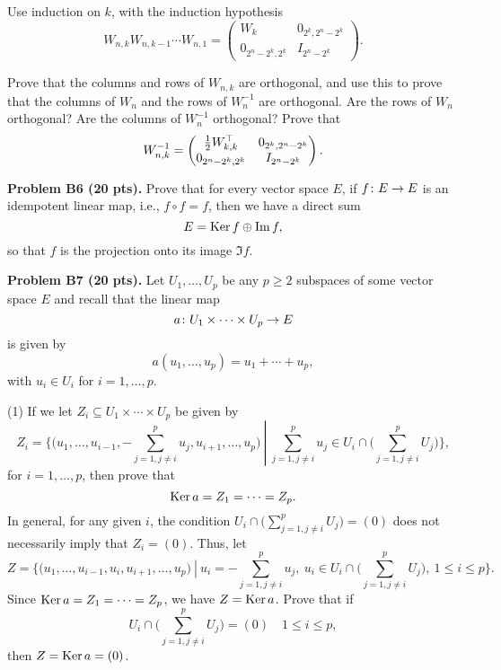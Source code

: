 \documentclass[12pt]{article}
\begin{document}
\medskip
\hint
Use induction on $k$,  with the induction hypothesis
\[
W_{n, k} W_{n, k - 1}\cdots W_{n, 1} = 
\begin{pmatrix}
 W_{k} & 0_{2^{k}, 2^{n} - 2^{k}} \\
0_{2^{n}- 2^{k}, 2^k} &  I_{2^{n} - 2^{k}}
\end{pmatrix}.
\]


\medskip
Prove that the columns and rows of $W_{n, k}$ are orthogonal, and use
this to prove that the columns of $W_n$ and the rows of
$W_n^{-1}$ are orthogonal. 
Are the rows of  $W_n$ orthogonal?
Are the columns of  $W_n^{-1}$ orthogonal?
Prove that
\[
W_{n, k}^{-1} = 
\begin{pmatrix}
 \frac{1}{2}W_{k, k}^{\top} & 0_{2^{k}, 2^{n} - 2^{k}} \\
0_{2^{n}- 2^{k}, 2^k} &  I_{2^{n} - 2^{k}}
\end{pmatrix}.
\]


\vspace {0.25cm}\noindent
{\bf Problem B6 (20 pts).}
Prove that 
for every vector space $E$, if $f\colon E\rightarrow E$ is an idempotent
linear map, i.e., $f\circ f = f$, then we have a direct sum
\[
E = {\rm Ker}\,{f} \oplus {\rm Im}\,{f},
\]
so that $f$ is the projection onto its image $\Im{f}$.


\vspace {0.25cm}\noindent
{\bf Problem B7 (20 pts).}
Let $U_1, \ldots, U_p$ be any  $p \geq 2$  subspaces of some vector
space $E$ and recall that the linear map
\[
a\colon U_1\times \cdots \times U_p\rightarrow E
\]
is given by
\[
a(u_1, \ldots, u_p) = u_1 + \cdots + u_p,
\]
with $u_i \in U_i$ for $i = 1, \ldots, p$.

\medskip
(1)
If we let $Z_i \subseteq U_1\times \cdots \times U_p$ be given by
\[
Z_i = \left.\bigg\{\Big(u_1, \ldots, u_{i - 1}, -\sum_{j = 1, j \not= i}^p u_j, u_{i + 1}, 
\ldots, u_p\Big) \>\right|\> \sum_{j = 1, j \not= i}^p u_j  \in  
U_i \cap \bigg(\sum_{j = 1, j \not= i}^p U_j \bigg) 
\bigg\},
\]
for $i = 1, \ldots, p$, then prove that
\[
{\rm Ker}\,{a} = Z_1 = \cdots =   Z_p.
\]
In general, for any given $i$, the condition
$U_i \cap \bigg(\sum_{j = 1, j \not= i}^p U_j \bigg) =
(0)$ does not necessarily imply that $Z_i = (0)$.
Thus, let 
\[
Z = \left.\bigg\{\Big(u_1, \ldots, u_{i - 1}, u_i, u_{i + 1}, 
\ldots, u_p\Big) \>\right|\> u_i =  -\sum_{j = 1, j \not= i}^p u_j, \>
u_i   \in  
U_i \cap \bigg(\sum_{j = 1, j \not= i}^p U_j \bigg), \> 1\leq i \leq p 
\bigg\}.
\]
Since ${\rm Ker}\,{a} = Z_1 = \cdots =  Z_p$, we have $Z = {\rm Ker}\, a$.
Prove that if
\[
U_i \cap \bigg(\sum_{j = 1, j \not= i}^p U_j \bigg) = (0)
\quad 1 \leq i \leq p,
\]
then $Z = {\rm Ker}\, a = (0)$.
\end{document}
